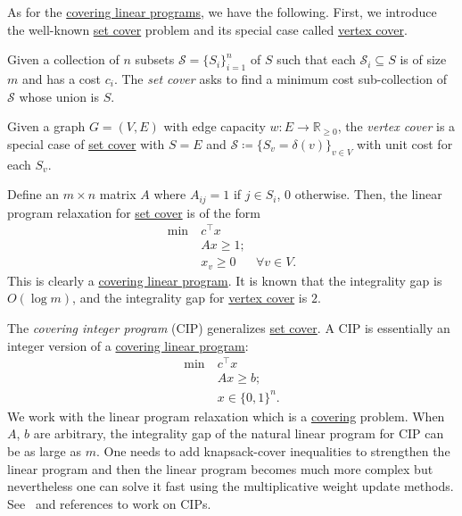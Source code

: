 As for the \hyperref[def:covering-LP]{covering linear programs}, we have the following. First, we introduce the well-known \hyperref[prb:set-cover]{set cover} problem and its special case called \hyperref[prb:vertex-cover]{vertex cover}.

\begin{problem}\label{prb:set-cover}
Given a collection of \(n\) subsets \(\mathcal{S} = \{ S_i \} _{i=1}^{n}\) of \(S\) such that each \(\mathcal{S} _i \subseteq S\) is of size \(m\) and has a cost \(c_i\). The \emph{set cover} asks to find a minimum cost sub-collection of \(\mathcal{S} \) whose union is \(S\).
\end{problem}

\begin{problem}\label{prb:vertex-cover}
Given a graph \(G = (V, E)\) with edge capacity \(w \colon E \to \mathbb{R} _{\geq 0}\), the \emph{vertex cover} is a special case of \hyperref[prb:set-cover]{set cover} with \(S = E\) and \(\mathcal{S} \coloneqq \{ S_v = \delta (v)\} _{v \in V}\) with unit cost for each \(S_v\).
\end{problem}

\begin{eg}
	Define an \(m \times n\) matrix \(A\) where \(A_{ij} = 1\) if \(j \in S_i\), \(0\) otherwise. Then, the linear program relaxation for \hyperref[prb:set-cover]{set cover} is of the form
	\[
		\begin{aligned}
			\min~ & c^{\top} x                      \\
			      & Ax \geq 1 ;                     \\
			      & x_v \geq 0  & \forall  v \in V.
		\end{aligned}
	\]
	This is clearly a \hyperref[def:covering-LP]{covering linear program}. It is known that the integrality gap is \(O(\log m)\), and the integrality gap for \hyperref[prb:vertex-cover]{vertex cover} is \(2\).
\end{eg}

\begin{eg}
	The \emph{covering integer program} (CIP) generalizes \hyperref[prb:set-cover]{set cover}. A CIP is essentially an integer version of a \hyperref[def:covering-LP]{covering linear program}:
	\[
		\begin{aligned}
			\min~ & c^{\top} x           \\
			      & Ax \geq b ;          \\
			      & x \in \{ 0, 1 \} ^n.
		\end{aligned}
	\]
	We work with the linear program relaxation which is a \hyperref[def:covering-LP]{covering} problem. When \(A\), \(b\) are arbitrary, the integrality gap of the natural linear program for CIP can be as large as \(m\). One needs to add knapsack-cover inequalities to strengthen the linear program and then the linear program becomes much more complex but nevertheless one can solve it fast using the multiplicative weight update methods. See~\cite{chekuri2019approximating} and references to work on CIPs.
\end{eg}

